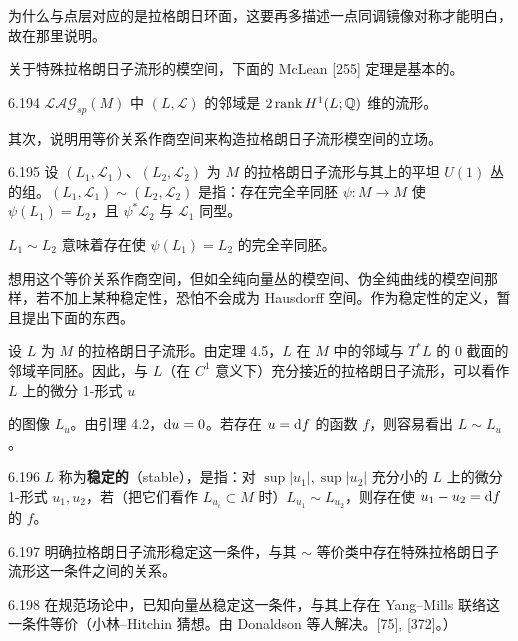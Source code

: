 为什么与点层对应的是拉格朗日环面，这要再多描述一点同调镜像对称才能明白，故在那里说明。

关于特殊拉格朗日子流形的模空间，下面的 McLean [255] 定理是基本的。

\begin{theorem}{6.194}
  $\mathcal{LAG}_{sp}(M)$ 中 $(L,\mathcal L)$ 的邻域是 $2\,\mathrm{rank}\,H^1(L;\mathbb{Q})$ 维的流形。
\end{theorem}

其次，说明用等价关系作商空间来构造拉格朗日子流形模空间的立场。

\begin{definition}{6.195}
  设 $(L_1,\mathcal L_1)$、$(L_2,\mathcal L_2)$ 为 $M$ 的拉格朗日子流形与其上的平坦 $U(1)$ 丛的组。$(L_1,\mathcal L_1)\sim(L_2,\mathcal L_2)$ 是指：存在完全辛同胚 $\psi:M\to M$ 使 $\psi(L_1)=L_2$，且 $\psi^*\mathcal L_2$ 与 $\mathcal L_1$ 同型。

  $L_1\sim L_2$ 意味着存在使 $\psi(L_1)=L_2$ 的完全辛同胚。
\end{definition}

想用这个等价关系作商空间，但如全纯向量丛的模空间、伪全纯曲线的模空间那样，若不加上某种稳定性，恐怕不会成为 Hausdorff 空间。作为稳定性的定义，暂且提出下面的东西。

设 $L$ 为 $M$ 的拉格朗日子流形。由定理 4.5，$L$ 在 $M$ 中的邻域与 $T^*L$ 的 $0$ 截面的邻域辛同胚。因此，与 $L$（在 $C^1$ 意义下）充分接近的拉格朗日子流形，可以看作 $L$ 上的微分 1-形式 $u$

的图像 $L_u$。由引理 4.2，$\mathrm{d} u=0$。若存在 $u=\mathrm{d} f$ 的函数 $f$，则容易看出 $L\sim L_u$。

\begin{definition}{6.196}
  $L$ 称为\textbf{稳定的}（stable），是指：对 $\sup|u_1|,\sup|u_2|$ 充分小的 $L$ 上的微分 1-形式 $u_1,u_2$，若（把它们看作 $L_{u_i}\subset M$ 时）$L_{u_1}\sim L_{u_2}$，则存在使 $u_1-u_2=\mathrm{d} f$ 的 $f$。
\end{definition}

\begin{problem}{6.197}
  明确拉格朗日子流形稳定这一条件，与其 $\sim$ 等价类中存在特殊拉格朗日子流形这一条件之间的关系。
\end{problem}

\begin{remark}{6.198}
  在规范场论中，已知向量丛稳定这一条件，与其上存在 Yang–Mills 联络这一条件等价（小林–Hitchin 猜想。由 Donaldson 等人解决。[75], [372]。）
\end{remark}

